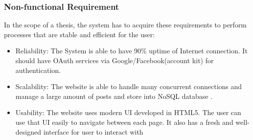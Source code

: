 \subsubsection{Non-functional Requirement}
In the scope of a thesis, the system has to acquire these requirements to perform processes that are stable and efficient for the user:
\begin{itemize}
	\item Reliability: The System is able to have 90\% uptime of Internet connection. It should have OAuth services via Google/Facebook(account kit) for authentication.
	\item Scalability: The website is able to handle many concurrent connections and manage a large amount of posts and store into NoSQL database .
	\item Usability: The website uses modern UI developed in HTML5. The user can use that UI easily to navigate between each page. It also has a fresh and well-designed interface for user to interact with
\end{itemize} 
